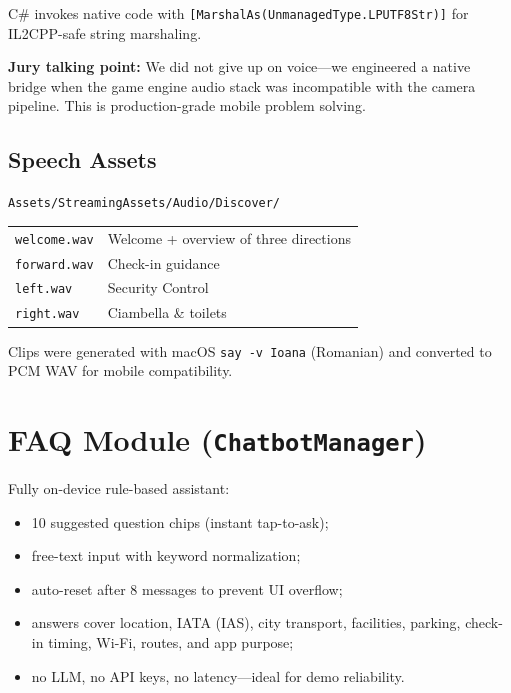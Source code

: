 \documentclass[11pt,a4paper]{article}
\begin{document}
C\# invokes native code with \texttt{[MarshalAs(UnmanagedType.LPUTF8Str)]} for IL2CPP-safe string marshaling.

\begin{techbox}
\textbf{Jury talking point:} We did not give up on voice---we engineered a native bridge when the game engine audio stack was incompatible with the camera pipeline. This is production-grade mobile problem solving.
\end{techbox}

\subsection{Speech Assets}

\begin{center}
\texttt{Assets/StreamingAssets/Audio/Discover/}
\end{center}

\begin{tabular}{@{}ll@{}}
\texttt{welcome.wav} & Welcome + overview of three directions \\
\texttt{forward.wav} & Check-in guidance \\
\texttt{left.wav} & Security Control \\
\texttt{right.wav} & Ciambella \& toilets \\
\end{tabular}

Clips were generated with macOS \texttt{say -v Ioana} (Romanian) and converted to PCM WAV for mobile compatibility.

\section{FAQ Module (\texttt{ChatbotManager})}

Fully on-device rule-based assistant:

\begin{itemize}
    \item 10 suggested question chips (instant tap-to-ask);
    \item free-text input with keyword normalization;
    \item auto-reset after 8 messages to prevent UI overflow;
    \item answers cover location, IATA (IAS), city transport, facilities, parking, check-in timing, Wi-Fi, routes, and app purpose;
    \item no LLM, no API keys, no latency---ideal for demo reliability.
\end{itemize}
\end{document}
